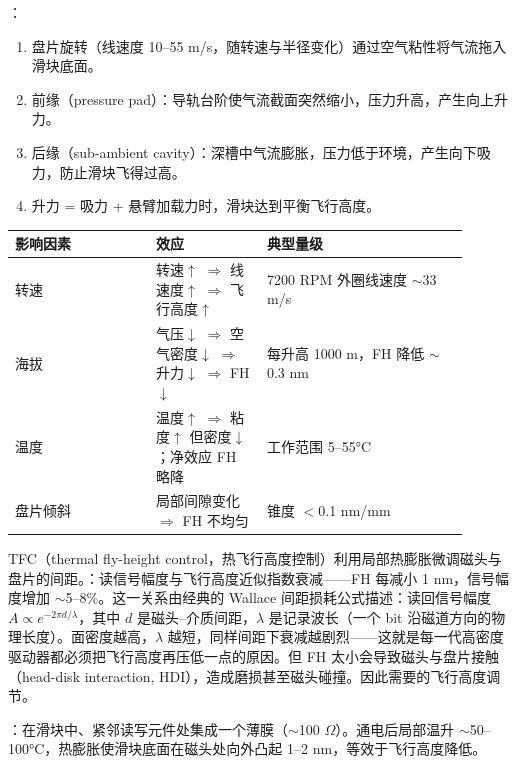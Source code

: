 ：
\begin{enumerate}
\item 盘片旋转（线速度 10--55 m/s，随转速与半径变化）通过空气粘性将气流拖入滑块底面。
\item 前缘（pressure pad）：导轨台阶使气流截面突然缩小，压力升高，产生向上升力。
\item 后缘（sub-ambient cavity）：深槽中气流膨胀，压力低于环境，产生向下吸力，防止滑块飞得过高。
\item 升力 = 吸力 + 悬臂加载力时，滑块达到平衡飞行高度。
\end{enumerate}

\begin{longtable}{L{0.28\linewidth}L{0.22\linewidth}L{0.4\linewidth}}
\toprule
影响因素 & 效应 & 典型量级 \\
\midrule
转速 & 转速$\uparrow$ $\Rightarrow$ 线速度$\uparrow$ $\Rightarrow$ 飞行高度$\uparrow$ & 7200 RPM 外圈线速度 $\sim$33 m/s \\
海拔 & 气压$\downarrow$ $\Rightarrow$ 空气密度$\downarrow$ $\Rightarrow$ 升力$\downarrow$ $\Rightarrow$ FH$\downarrow$ & 每升高 1000 m，FH 降低 $\sim$0.3 nm \\
温度 & 温度$\uparrow$ $\Rightarrow$ 粘度$\uparrow$ 但密度$\downarrow$；净效应 FH 略降 & 工作范围 5--55°C \\
盘片倾斜 & 局部间隙变化 $\Rightarrow$ FH 不均匀 & 锥度 $<$0.1 nm/mm \\
\bottomrule
\end{longtable}


TFC（thermal fly-height control，热飞行高度控制）利用局部热膨胀微调磁头与盘片的间距。：读信号幅度与飞行高度近似指数衰减——FH 每减小 1 nm，信号幅度增加 $\sim$5--8\%。这一关系由经典的 Wallace 间距损耗公式描述：读回信号幅度 $A \propto e^{-2\pi d/\lambda}$，其中 $d$ 是磁头--介质间距，$\lambda$ 是记录波长（一个 bit 沿磁道方向的物理长度）。面密度越高，$\lambda$ 越短，同样间距下衰减越剧烈——这就是每一代高密度驱动器都必须把飞行高度再压低一点的原因。但 FH 太小会导致磁头与盘片接触（head-disk interaction, HDI），造成磨损甚至磁头碰撞。因此需要的飞行高度调节。

：在滑块中、紧邻读写元件处集成一个薄膜（$\sim$100 $\Omega$）。通电后局部温升 $\sim$50--100°C，热膨胀使滑块底面在磁头处向外凸起 1--2 nm，等效于飞行高度降低。

